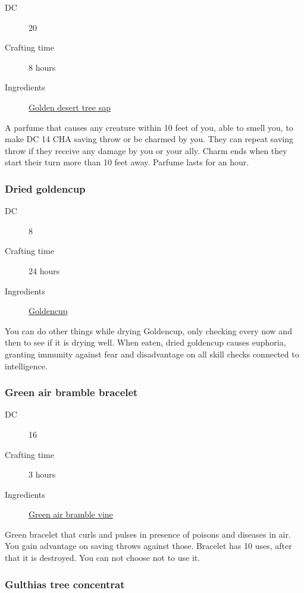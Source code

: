 \begin{description}
\item [DC] 20
\item [Crafting time] 8 hours
\item [Ingredients] \hyperref[Golden Desert Tree]{Golden desert tree sap}
\end{description}

A parfume that causes any creature within 10 feet of you, able to smell you, to make DC 14 CHA
 saving throw or be charmed by you. They can repeat saving throw if they receive any damage by you 
 or your ally. Charm ends when they start their turn more than 10 feet away. Parfume lasts for an hour.

\subsubsection{Dried goldencup}
\label{Dried goldencup}

\begin{description}
\item [DC] 8
\item [Crafting time] 24 hours
\item [Ingredients] \hyperref[Goldencup]{Goldencup}
\end{description}

You can do other things while drying Goldencup, only checking every now and then to see if it is drying well.
 When eaten, dried goldencup causes euphoria, granting immunity against fear and 
 disadvantage on all skill checks connected to intelligence.

\subsubsection{Green air bramble bracelet}
\label{Green air bramble bracelet}

\begin{description}
\item [DC] 16
\item [Crafting time] 3 hours
\item [Ingredients] \hyperref[Green Air Bramble]{Green air bramble vine}
\end{description}

Green bracelet that curls and pulses in presence of poisons and diseases in air. 
You gain advantage on saving throws against those. 
Bracelet has 10 uses, after that it is destroyed. You can not choose not to use it.

\subsubsection{Gulthias tree concentrat}
\label{Gulthias tree concentrat}

